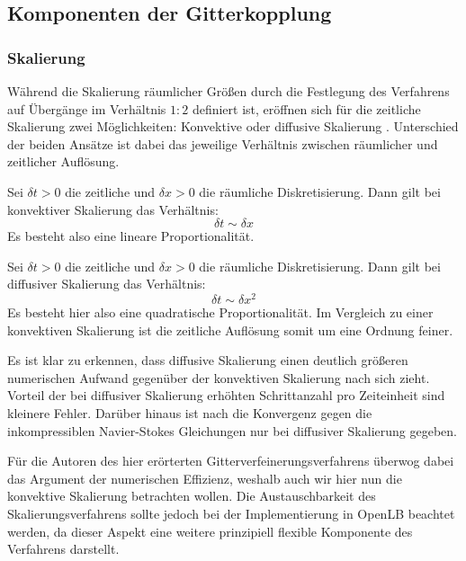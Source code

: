 \newpage
\subsection{Komponenten der Gitterkopplung}\label{kap:Komponenten}
\subsubsection{Skalierung}\label{kap:Skalierung}

Während die Skalierung räumlicher Größen durch die Festlegung des Verfahrens auf Übergänge im Verhältnis \(1:2\) definiert ist, eröffnen sich für die zeitliche Skalierung zwei Möglichkeiten: Konvektive oder diffusive Skalierung \cite[Kap.~7.2.2.1]{Krueger17}. Unterschied der beiden Ansätze ist dabei das jeweilige Verhältnis zwischen räumlicher und zeitlicher Auflösung.

\begin{Definition}
Sei \(\delta t > 0\) die zeitliche und \(\delta x > 0\) die räumliche Diskretisierung. Dann gilt bei konvektiver Skalierung das Verhältnis:
\[ \delta t \sim \delta x \]
Es besteht also eine lineare Proportionalität.
\end{Definition}

\begin{Definition}
Sei \(\delta t > 0\) die zeitliche und \(\delta x > 0\) die räumliche Diskretisierung. Dann gilt bei diffusiver Skalierung das Verhältnis:
\[ \delta t \sim \delta x^2 \]
Es besteht hier also eine quadratische Proportionalität. Im Vergleich zu einer konvektiven Skalierung ist die zeitliche Auflösung somit um eine Ordnung feiner.
\end{Definition}

Es ist klar zu erkennen, dass diffusive Skalierung einen deutlich größeren numerischen Aufwand gegenüber der konvektiven Skalierung nach sich zieht. Vorteil der bei diffusiver Skalierung erhöhten Schrittanzahl pro Zeiteinheit sind kleinere Fehler. Darüber hinaus ist nach \cite[S.~276]{Krueger17} die Konvergenz gegen die inkompressiblen Navier-Stokes Gleichungen nur bei diffusiver Skalierung gegeben.

Für die Autoren des hier erörterten Gitterverfeinerungsverfahrens überwog dabei das Argument der numerischen Effizienz, weshalb auch wir hier nun die konvektive Skalierung betrachten wollen. Die Austauschbarkeit des Skalierungsverfahrens sollte jedoch bei der Implementierung in OpenLB beachtet werden, da dieser Aspekt eine weitere prinzipiell flexible Komponente des Verfahrens darstellt.

